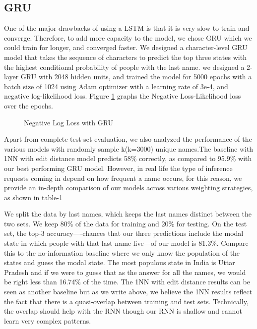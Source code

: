 \documentclass[11pt,  letterpaper]{article}
\begin{document}
\subsection{GRU}

One of the major drawbacks of using a LSTM is that it is very slow to train and converge. Therefore, to add more capacity to the model, we chose GRU which we could train for longer, and converged faster. We designed a character-level GRU model that takes the sequence of characters to predict the top three states with the highest conditional probability of people with the last name. we designed a 2-layer GRU with 2048 hidden units, and trained the model for 5000 epochs with a batch size of 1024 using Adam optimizer with a learning rate of 3e-4, and negative log-likelihood loss. Figure \ref{fig3:gru_loss} graphs the Negative Loss-Likelihood loss over the epochs.

\begin{figure}[ht]
  \centering
  \caption{Negative Log Loss with GRU}
  \label{fig3:gru_loss}
\end{figure}


Apart from complete test-set evaluation, we also analyzed the performance of the various models with randomly sample k(k=3000) unique names.The baseline with 1NN with edit distance model predicts 58\% correctly, as compared to 95.9\% with our best performing GRU model. However, in real life the type of inference requests coming in depend on how frequent a name occurs, for this reason, we provide an in-depth comparison of our models across various weighting strategies, as shown in table-1



We split the data by last names, which keeps the last names distinct between the two sets. We keep 80\% of the data for training and 20\% for testing. On the test set, the top-3 accuracy—-chances that our three predictions include the modal state in which people with that last name live—of our model is 81.3\%. Compare this to the no-information baseline where we only know the population of the states and guess the modal state. The most populous state in India is Uttar Pradesh and if we were to guess that as the answer for all the names, we would be right less than 16.74\% of the time. The 1NN with edit distance results can be seen as another baseline but as we write above, we believe the 1NN results reflect the fact that there is a quasi-overlap between training and test sets. Technically, the overlap should help with the RNN though our RNN is shallow and cannot learn very complex patterns. 
\end{document}
